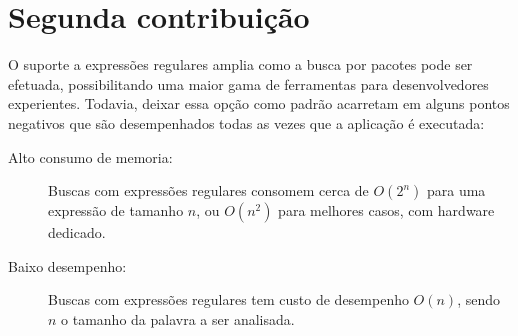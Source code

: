 

\section{Segunda contribuição} %
\label{sec:segunda_contribui_o}

O suporte a expressões regulares amplia como a busca por pacotes pode ser efetuada, possibilitando uma maior gama de ferramentas para desenvolvedores experientes. Todavia, deixar essa opção como padrão acarretam em alguns pontos negativos que são desempenhados todas as vezes que a aplicação é executada:

\begin{description}
	\item [Alto consumo de memoria:] Buscas com expressões regulares consomem cerca de $O(2^n)$ para uma expressão de tamanho $n$, ou $O(n^2)$ para melhores casos, com hardware dedicado\cite{sidhu2001fast}.
	\item [Baixo desempenho:] Buscas com expressões regulares tem custo de desempenho $O(n)$, sendo $n$ o tamanho da palavra a ser analisada.
\end{description}



